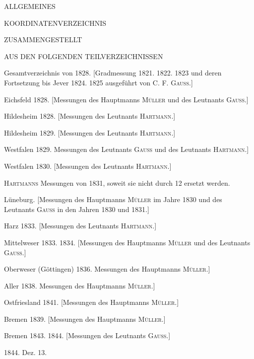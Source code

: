\clearpage{}%
\thispagestyle{empty}
\begin{center}\Large ALLGEMEINES\par\medskip KOORDINATENVERZEICHNIS\par\bigskip
\normalsize ZUSAMMENGESTELLT\par\medskip AUS DEN FOLGENDEN TEILVERZEICHNISSEN\end{center}
\smallskip
\begin{list}{}{\setlength{\leftmargin}{2.5em}\setlength{\labelwidth}{2.3em}\setlength{\labelsep}{.2em}\setlength{\itemsep}{3pt}\setlength{\parsep}{0pt}}
\item[Nr. 1)] Gesamtverzeichnis von 1828. [Gradmessung 1821. 1822. 1823 und deren Fortsetzung bis Jever 1824. 1825 ausgeführt von C. F. \textsc{Gauss}.]
\item[2)] Eichsfeld 1828. [Messungen des Hauptmanns \textsc{Müller} und des Leutnants \textsc{Gauss}.]
\item[3)] Hildesheim 1828. [Messungen des Leutnants \textsc{Hartmann}.]
\item[4)] Hildesheim 1829. [Messungen des Leutnants \textsc{Hartmann}.]
\item[5)] Westfalen 1829. Messungen des Leutnants \textsc{Gauss} und des Leutnants \textsc{Hartmann}.]
\item[6)] Westfalen 1830. [Messungen des Leutnants \textsc{Hartmann}.]
\item[6*)] \textsc{Hartmanns} Messungen von 1831, soweit sie nicht durch 12 ersetzt werden.
\item[7)] Lüneburg. [Messungen des Hauptmanns \textsc{Müller} im Jahre 1830 und des Leutnants \textsc{Gauss} in den Jahren 1830 und 1831.]
\item[8)] Harz 1833. [Messungen des Leutnants \textsc{Hartmann}.]
\item[9)] Mittelweser 1833. 1834. [Messungen des Hauptmanns \textsc{Müller} und des Leutnants \textsc{Gauss}.]
\item[10)] Oberweser (Göttingen) 1836. Messungen des Hauptmanns \textsc{Müller}.]
\item[11)] Aller 1838. Messungen des Hauptmanns \textsc{Müller}.]
\item[12)] Ostfriesland 1841. [Messungen des Hauptmanns \textsc{Müller}.]
\item[13)] Bremen 1839. [Messungen des Hauptmanns \textsc{Müller}.]
\item[14)] Bremen 1843. 1844. [Messungen des Leutnants \textsc{Gauss}.]
\end{list}
\begin{center}1844. Dez. 13.\end{center}
